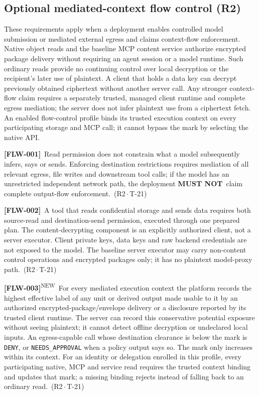 \documentclass[11pt,a4paper]{article}
\newcommand{\mustnot}{\textbf{MUST NOT}}
\newcommand{\code}[1]{{\small\nolinkurl{#1}}}
\newcommand{\reqtag}[2]{{\footnotesize\color{accent}(#1\,$\cdot$\,#2)}}
\newcommand{\req}[4]{\par\noindent\hypertarget{req:#1}{\textbf{[#1]}}\ #4\ \reqtag{#2}{#3}\par}
\newcommand{\reqn}[4]{\par\noindent\hypertarget{req:#1}{\textbf{[#1]}}\textsuperscript{\color{accent}\tiny NEW}\ #4\ \reqtag{#2}{#3}\par}
\begin{document}
\subsection{Optional mediated-context flow control (R2)}\label{sec:flow}
These requirements apply when a deployment enables controlled model submission or mediated external egress and claims context-flow enforcement. Native object reads and the baseline MCP content service authorize encrypted package delivery without requiring an agent session or a model runtime. Such ordinary reads provide no continuing control over local decryption or the recipient's later use of plaintext. A client that holds a data key can decrypt previously obtained ciphertext without another server call. Any stronger context-flow claim requires a separately trusted, managed client runtime and complete egress mediation; the server does not infer plaintext use from a ciphertext fetch. An enabled flow-control profile binds its trusted execution context on every participating storage and MCP call; it cannot bypass the mark by selecting the native API.
\req{FLW-001}{R2}{T-21}{Read permission does not constrain what a model subsequently infers, says or sends. Enforcing destination restrictions requires mediation of all relevant egress, file writes and downstream tool calls; if the model has an unrestricted independent network path, the deployment \mustnot\ claim complete output-flow enforcement.}
\req{FLW-002}{R2}{T-21}{A tool that reads confidential storage and sends data requires both source-read and destination-send permission, executed through one prepared plan. The content-decrypting component is an explicitly authorized client, not a server executor. Client private keys, data keys and raw backend credentials are not exposed to the model. The baseline server executor may carry non-content control operations and encrypted packages only; it has no plaintext model-proxy path.}
\reqn{FLW-003}{R2}{T-21}{For every mediated execution context the platform records the highest effective label of any unit or derived output made usable to it by an authorized encrypted-package/envelope delivery or a disclosure reported by its trusted client runtime. The server can record this conservative potential exposure without seeing plaintext; it cannot detect offline decryption or undeclared local inputs. An egress-capable call whose destination clearance is below the mark is \code{DENY}, or \code{NEEDS_APPROVAL} when a policy output says so. The mark only increases within its context. For an identity or delegation enrolled in this profile, every participating native, MCP and service read requires the trusted context binding and updates that mark; a missing binding rejects instead of falling back to an ordinary read.}
\end{document}
